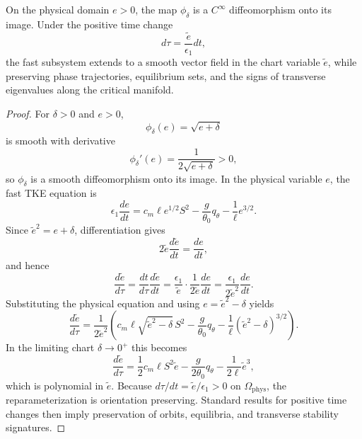 \begin{proposition}
On the physical domain $e > 0$, the map $\phi_\delta$ is a $C^\infty$ diffeomorphism onto its image. Under the positive time change
\begin{equation}
d\tau = \frac{\tilde e}{\epsilon_1} dt,
\end{equation}
the fast subsystem extends to a smooth vector field in the chart variable $\tilde e$, while preserving phase trajectories, equilibrium sets, and the signs of transverse eigenvalues along the critical manifold.
\end{proposition}

\begin{proof}
For $\delta > 0$ and $e > 0$,
\begin{equation}
\phi_\delta(e) = \sqrt{e+\delta}
\end{equation}
is smooth with derivative
\begin{equation}
\phi_\delta'(e) = \frac{1}{2\sqrt{e+\delta}} > 0,
\end{equation}
so $\phi_\delta$ is a smooth diffeomorphism onto its image. In the physical variable $e$, the fast TKE equation is
\begin{equation}
\epsilon_1 \frac{de}{dt}
= c_m \ell e^{1/2} S^2
- \frac{g}{\theta_0} q_\theta
- \frac{1}{\ell} e^{3/2}.
\end{equation}
Since $\tilde e^2 = e + \delta$, differentiation gives
\begin{equation}
2\tilde e \frac{d\tilde e}{dt} = \frac{de}{dt},
\end{equation}
and hence
\begin{equation}
\frac{d\tilde e}{d\tau}
= \frac{dt}{d\tau}\frac{d\tilde e}{dt}
= \frac{\epsilon_1}{\tilde e}\cdot \frac{1}{2\tilde e}\frac{de}{dt}
= \frac{\epsilon_1}{2\tilde e^2}\frac{de}{dt}.
\end{equation}
Substituting the physical equation and using $e = \tilde e^2 - \delta$ yields
\begin{equation}
\frac{d\tilde e}{d\tau}
= \frac{1}{2\tilde e^2}
\left(
c_m \ell \sqrt{\tilde e^2 - \delta}\,S^2
- \frac{g}{\theta_0} q_\theta
- \frac{1}{\ell}(\tilde e^2 - \delta)^{3/2}
\right).
\end{equation}
In the limiting chart $\delta \to 0^+$ this becomes
\begin{equation}
\frac{d\tilde e}{d\tau}
= \frac{1}{2} c_m \ell S^2 \tilde e
- \frac{g}{2\theta_0} q_\theta
- \frac{1}{2\ell} \tilde e^3,
\end{equation}
which is polynomial in $\tilde e$. Because $d\tau/dt = \tilde e/\epsilon_1 > 0$ on $\Omega_{\mathrm{phys}}$, the reparameterization is orientation preserving. Standard results for positive time changes then imply preservation of orbits, equilibria, and transverse stability signatures.
\end{proof}

